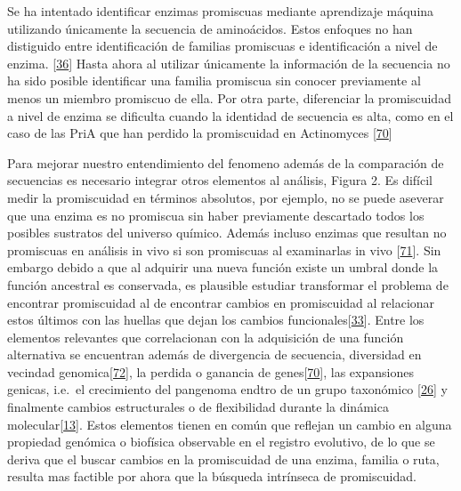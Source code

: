 \documentclass[12pt,twoside]{reedthesis}
\begin{document}
  Se ha intentado identificar enzimas promiscuas mediante aprendizaje
  máquina utilizando únicamente la secuencia de aminoácidos. Estos
  enfoques no han distiguido entre identificación de familias promiscuas e
  identificación a nivel de enzima.
  {[}\protect\hyperlink{ref-carbonell_molecular_2010}{36}{]} Hasta ahora
  al utilizar únicamente la información de la secuencia no ha sido posible
  identificar una familia promiscua sin conocer previamente al menos un
  miembro promiscuo de ella. Por otra parte, diferenciar la promiscuidad a
  nivel de enzima se dificulta cuando la identidad de secuencia es alta,
  como en el caso de las PriA que han perdido la promiscuidad en
  Actinomyces
  {[}\protect\hyperlink{ref-juarez-vazquez_evolution_2017}{70}{]}
  
  Para mejorar nuestro entendimiento del fenomeno además de la comparación
  de secuencias es necesario integrar otros elementos al análisis, Figura
  2. Es difícil medir la promiscuidad en términos absolutos, por ejemplo,
  no se puede aseverar que una enzima es no promiscua sin haber
  previamente descartado todos los posibles sustratos del universo
  químico. Además incluso enzimas que resultan no promiscuas en análisis
  in vivo si son promiscuas al examinarlas in vivo
  {[}\protect\hyperlink{ref-noda_tesis_2012}{71}{]}. Sin embargo debido a
  que al adquirir una nueva función existe un umbral donde la función
  ancestral es conservada, es plausible estudiar transformar el problema
  de encontrar promiscuidad al de encontrar cambios en promiscuidad al
  relacionar estos últimos con las huellas que dejan los cambios
  funcionales{[}\protect\hyperlink{ref-soskine_mutational_2010}{33}{]}.
  Entre los elementos relevantes que correlacionan con la adquisición de
  una función alternativa se encuentran además de divergencia de
  secuencia, diversidad en vecindad
  genomica{[}\protect\hyperlink{ref-zhao__function_prediction_neighbourhood_2014}{72}{]},
  la perdida o ganancia de
  genes{[}\protect\hyperlink{ref-juarez-vazquez_evolution_2017}{70}{]},
  las expansiones genicas, i.e.~el crecimiento del pangenoma endtro de un
  grupo taxonómico
  {[}\protect\hyperlink{ref-martinez-nunez_lifestyle_2015}{26}{]} y
  finalmente cambios estructurales o de flexibilidad durante la dinámica
  molecular{[}\protect\hyperlink{ref-zou_evolution_2015}{13}{]}. Estos
  elementos tienen en común que reflejan un cambio en alguna propiedad
  genómica o biofísica observable en el registro evolutivo, de lo que se
  deriva que el buscar cambios en la promiscuidad de una enzima, familia o
  ruta, resulta mas factible por ahora que la búsqueda intrínseca de
  promiscuidad.
  
\end{document}
